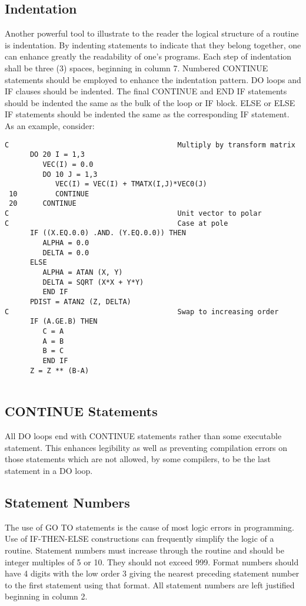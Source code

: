 \subsection{Indentation}
Another powerful tool to illustrate to the reader the logical
structure of a routine is indentation.  By indenting statements to
indicate that they belong together, one can enhance greatly the
readability of one's programs.  Each step of indentation shall be
three (3) spaces, beginning in column 7.  Numbered CONTINUE statements
should be employed to enhance the indentation pattern.  DO loops and
IF clauses should be indented. The final CONTINUE and END IF statements
should be indented the same as the bulk of the loop or IF block.  ELSE
or ELSE IF statements should be indented the same as the corresponding
IF statement.
As an example, consider:

\begin{verbatim}
C                                        Multiply by transform matrix
      DO 20 I = 1,3
         VEC(I) = 0.0
         DO 10 J = 1,3
            VEC(I) = VEC(I) + TMATX(I,J)*VEC0(J)
 10         CONTINUE
 20      CONTINUE
C                                        Unit vector to polar
C                                        Case at pole
      IF ((X.EQ.0.0) .AND. (Y.EQ.0.0)) THEN
         ALPHA = 0.0
         DELTA = 0.0
      ELSE
         ALPHA = ATAN (X, Y)
         DELTA = SQRT (X*X + Y*Y)
         END IF
      PDIST = ATAN2 (Z, DELTA)
C                                        Swap to increasing order
      IF (A.GE.B) THEN
         C = A
         A = B
         B = C
         END IF
      Z = Z ** (B-A)


\end{verbatim}

\subsection{CONTINUE Statements}
All DO loops end with CONTINUE statements rather than some executable
statement.  This enhances legibility as well as preventing compilation
errors on those statements which are not allowed, by some compilers,
to be the last statement in a DO loop.



\subsection{Statement Numbers}
The use of GO TO statements is the cause of most logic errors in
programming.  Use of IF-THEN-ELSE constructions can frequently
simplify the logic of a routine.  Statement numbers must increase
through the routine and should be integer multiples of 5 or 10.  They
should not exceed 999.  Format numbers should have 4 digits with the
low order 3 giving the nearest preceding statement number to the first
statement using that format. All statement numbers are left justified
beginning in column 2.

